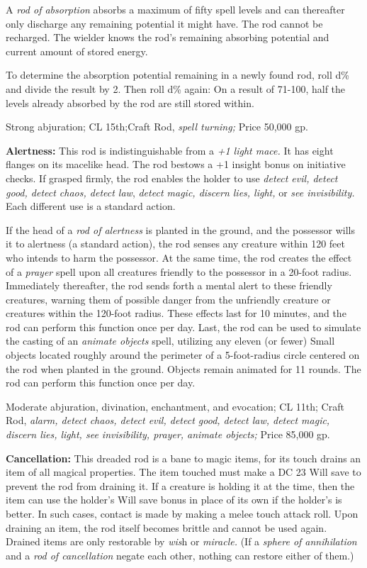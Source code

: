 \documentclass{article}
\begin{document}
A \textit{rod of absorption }absorbs a maximum of fifty spell levels and can thereafter 
only discharge any remaining potential it might have. The rod cannot be recharged. 
The wielder knows the rod's remaining absorbing potential and current amount of 
stored energy.

To determine the absorption potential remaining in a newly found rod, roll d\% 
and divide the result by 2. Then roll d\% again: On a result of 71-100, half the 
levels already absorbed by the rod are still stored within.

Strong abjuration; CL 15th;Craft Rod, \textit{spell turning; }Price 50,000 gp.

\textbf{Alertness:} This rod is indistinguishable from a \textit{+1 light mace. 
}It has eight flanges on its macelike head. The rod bestows a +1 insight bonus 
on initiative checks. If grasped firmly, the rod enables the holder to use \textit{detect 
evil, detect good, detect chaos, detect law}, \textit{detect magic, discern lies, 
light, }or \textit{see invisibility. }Each different use is a standard action.

If the head of a \textit{rod of alertness }is planted in the ground, and the possessor 
wills it to alertness (a standard action), the rod senses any creature within 120 
feet who intends to harm the possessor. At the same time, the rod creates the effect 
of a \textit{prayer }spell upon all creatures friendly to the possessor in a 20-foot 
radius. Immediately thereafter, the rod sends forth a mental alert to these friendly 
creatures, warning them of possible danger from the unfriendly creature or creatures 
within the 120-foot radius. These effects last for 10 minutes, and the rod can 
perform this function once per day. Last, the rod can be used to simulate the casting 
of an \textit{animate objects }spell, utilizing any eleven (or fewer) Small objects 
located roughly around the perimeter of a 5-foot-radius circle centered on the 
rod when planted in the ground. Objects remain animated for 11 rounds. The rod 
can perform this function once per day.

Moderate abjuration, divination, enchantment, and evocation; CL 11th; Craft Rod, 
\textit{alarm, detect chaos, detect evil, detect good, detect law, detect magic, 
discern lies, light, see invisibility, prayer, animate objects; }Price 85,000 gp.

\textbf{Cancellation:} This dreaded rod is a bane to magic items, for its touch 
drains an item of all magical properties. The item touched must make a DC 23 Will 
save to prevent the rod from draining it. If a creature is holding it at the time, 
then the item can use the holder's Will save bonus in place of its own if the holder's 
is better. In such cases, contact is made by making a melee touch attack roll. 
Upon draining an item, the rod itself becomes brittle and cannot be used again. 
Drained items are only restorable by \textit{wis}h or \textit{miracle. }(If a \textit{sphere 
of annihilation }and a \textit{rod of cancellation }negate each other, nothing 
can restore either of them.)
\end{document}
